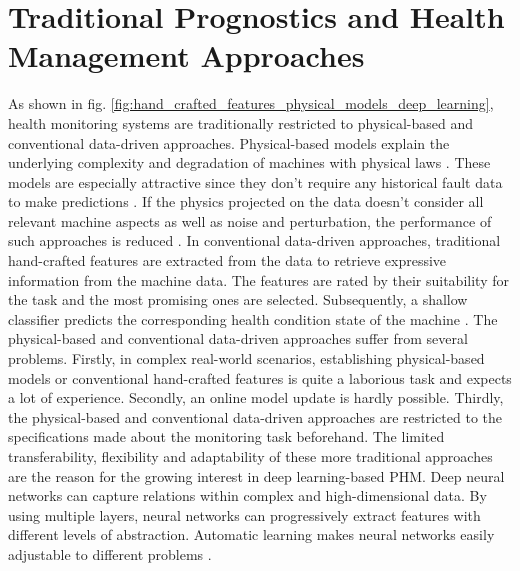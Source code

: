 \section{Traditional Prognostics and Health Management Approaches}
As shown in fig. \ref{fig:hand_crafted_features_physical_models_deep_learning}, health monitoring systems are traditionally restricted to physical-based and conventional data-driven approaches. Physical-based models explain the underlying complexity and degradation of machines with physical laws \cite{ZHAO2019213}. These models are especially attractive since they don't require any historical fault data to make predictions \cite{Benker2019}. If the physics projected on the data doesn't consider all relevant machine aspects as well as noise and perturbation, the performance of such approaches is reduced \cite{ZHAO2019213}. In conventional data-driven approaches, traditional hand-crafted features are extracted from the data to retrieve expressive information from the machine data. The features are rated by their suitability for the task and the most promising ones are selected. Subsequently, a shallow classifier predicts the corresponding health condition state of the machine \cite{ZHAO2019213}. The physical-based and conventional data-driven approaches suffer from several problems. Firstly, in complex real-world scenarios, establishing physical-based models or conventional hand-crafted features is quite a laborious task and expects a lot of experience. Secondly, an online model update is hardly possible. Thirdly, the physical-based and conventional data-driven approaches are restricted to the specifications made about the monitoring task beforehand. The limited transferability, flexibility and adaptability of these more traditional approaches are the reason for the growing interest in deep learning-based PHM. Deep neural networks can capture relations within complex and high-dimensional data. By using multiple layers, neural networks can progressively extract features with different levels of abstraction. Automatic learning makes neural networks easily adjustable to different problems \cite{ZHAO2019213}.
